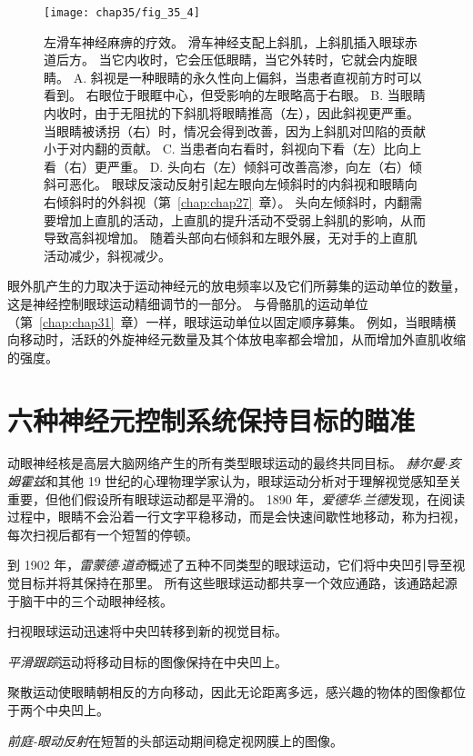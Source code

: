 \begin{figure}[htbp]
	\centering
	\texttt{[image: chap35/fig\_35\_4]}
	\caption{左滑车神经麻痹的疗效。
		滑车神经支配上斜肌，上斜肌插入眼球赤道后方。
		当它内收时，它会压低眼睛，当它外转时，它就会内旋眼睛。
		A. 斜视是一种眼睛的永久性向上偏斜，当患者直视前方时可以看到。
		右眼位于眼眶中心，但受影响的左眼略高于右眼。
		B. 当眼睛内收时，由于无阻扰的下斜肌将眼睛推高（左），因此斜视更严重。
		当眼睛被诱拐（右）时，情况会得到改善，因为上斜肌对凹陷的贡献小于对内翻的贡献。
		C. 当患者向右看时，斜视向下看（左）比向上看（右）更严重。
		D. 头向右（左）倾斜可改善高渗，向左（右）倾斜可恶化。
		眼球反滚动反射引起左眼向左倾斜时的内斜视和眼睛向右倾斜时的外斜视（第~\ref{chap:chap27}~章）。
		头向左倾斜时，内翻需要增加上直肌的活动，上直肌的提升活动不受弱上斜肌的影响，从而导致高斜视增加。
		随着头部向右倾斜和左眼外展，无对手的上直肌活动减少，斜视减少。}
	\label{fig:35_4}
\end{figure}


眼外肌产生的力取决于运动神经元的放电频率以及它们所募集的运动单位的数量，这是神经控制眼球运动精细调节的一部分。
与骨骼肌的运动单位（第~\ref{chap:chap31}~章）一样，眼球运动单位以固定顺序募集。
例如，当眼睛横向移动时，活跃的外旋神经元数量及其个体放电率都会增加，从而增加外直肌收缩的强度。



\section{六种神经元控制系统保持目标的瞄准}

动眼神经核是高层大脑网络产生的所有类型眼球运动的最终共同目标。
\textit{赫尔曼$\cdot$亥姆霍兹}和其他 19 世纪的心理物理学家认为，眼球运动分析对于理解视觉感知至关重要，但他们假设所有眼球运动都是平滑的。
1890 年，\textit{爱德华$\cdot$兰德}发现，在阅读过程中，眼睛不会沿着一行文字平稳移动，而是会快速间歇性地移动，称为扫视，每次扫视后都有一个短暂的停顿。


到 1902 年，\textit{雷蒙德$\cdot$道奇}概述了五种不同类型的眼球运动，它们将中央凹引导至视觉目标并将其保持在那里。
所有这些眼球运动都共享一个效应通路，该通路起源于脑干中的三个动眼神经核。


扫视眼球运动迅速将中央凹转移到新的视觉目标。


\textit{平滑跟踪}运动将移动目标的图像保持在中央凹上。


聚散运动使眼睛朝相反的方向移动，因此无论距离多远，感兴趣的物体的图像都位于两个中央凹上。


\textit{前庭-眼动反射}在短暂的头部运动期间稳定视网膜上的图像。


